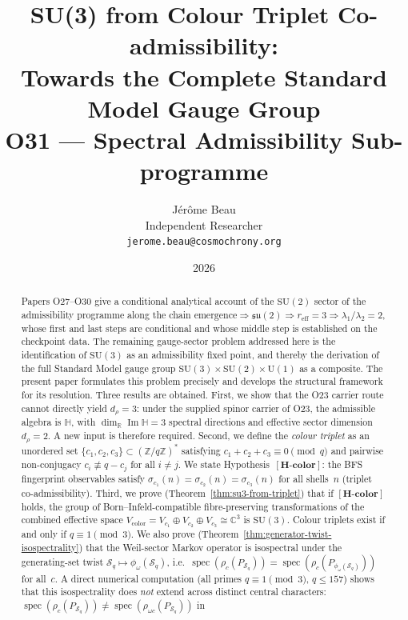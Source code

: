 \documentclass[11pt,a4paper]{article}
\title{\textbf{SU(3) from Colour Triplet Co-admissibility:\\
Towards the Complete Standard Model Gauge Group}\\[0.5em]
\large O31 --- Spectral Admissibility Sub-programme}
\author{J\'er\^ome Beau\\[0.3em]
\small Independent Researcher\\
\small \texttt{jerome.beau@cosmochrony.org}}
\date{2026}
\theoremstyle{definition}
\theoremstyle{remark}
\newcommand{\SU}{\mathrm{SU}}
\newcommand{\dr}{d_{\rho}}
\newcommand{\Hcolor}{\mathbf{[H\text{-}color]}}
\newcommand{\Z}{\mathbb{Z}}
\newcommand{\C}{\mathbb{C}}
\newcommand{\R}{\mathbb{R}}
\newcommand{\HH}{\mathbb{H}}
\newcommand{\Sq}{\mathcal{S}_q}
\begin{document}
  \maketitle

  \begin{abstract}
    Papers O27--O30 give a conditional analytical account of the $\SU(2)$ sector of the
    admissibility programme along the chain
    $\text{emergence} \Rightarrow \mathfrak{su}(2) \Rightarrow r_{\mathrm{eff}} = 3 \Rightarrow \lambda_1/\lambda_2 = 2$,
    whose first and last steps are conditional and whose middle step is established on the
    checkpoint data.
    The remaining gauge-sector problem addressed here is the identification of
    $\SU(3)$ as an admissibility fixed point, and thereby the derivation of the full Standard Model
    gauge group $\SU(3) \times \SU(2) \times \mathrm{U}(1)$ as a composite.
    The present paper formulates this problem precisely and develops the structural framework for
    its resolution.
    Three results are obtained.
    First, we show that the O23 carrier route cannot directly yield $d_\rho = 3$:
    under the supplied spinor carrier of O23, the admissible algebra is $\HH$, with
    $\dim_\R \operatorname{Im}\HH = 3$ spectral directions and effective sector dimension $\dr = 2$.
    A new input is therefore required.
    Second, we define the \emph{colour triplet} as an unordered set $\{c_1, c_2, c_3\} \subset
    (\Z/q\Z)^*$ satisfying $c_1 + c_2 + c_3 \equiv 0 \pmod{q}$ and pairwise non-conjugacy
    $c_i \not\equiv q - c_j$ for all $i \neq j$.
    We state Hypothesis~$\Hcolor$: the BFS fingerprint observables satisfy
    $\sigma_{c_1}(n) = \sigma_{c_2}(n) = \sigma_{c_3}(n)$ for all shells~$n$ (triplet co-admissibility).
    Third, we prove (Theorem~\ref{thm:su3-from-triplet}) that if $\Hcolor$ holds, the group of
    Born--Infeld-compatible fibre-preserving transformations of the combined effective space
    $V_{\mathrm{color}} = V_{c_1} \oplus V_{c_2} \oplus V_{c_3} \cong \C^3$ is $\SU(3)$.
    Colour triplets exist if and only if $q \equiv 1 \pmod{3}$.
    We also prove (Theorem~\ref{thm:generator-twist-isospectrality}) that the Weil-sector Markov
    operator is isospectral under the generating-set twist $\Sq \mapsto \phi_\omega(\Sq)$, i.e.\
    $\operatorname{spec}(\rho_c(P_{\Sq})) = \operatorname{spec}(\rho_c(P_{\phi_\omega(\Sq)}))$
    for all~$c$.
    A direct numerical computation (all primes $q \equiv 1 \pmod{3}$, $q \leq 157$) shows that this
    isospectrality does \emph{not} extend across distinct central characters:
    $\operatorname{spec}(\rho_c(P_{\Sq})) \neq \operatorname{spec}(\rho_{\omega c}(P_{\Sq}))$ in

\end{abstract}
\end{document}
